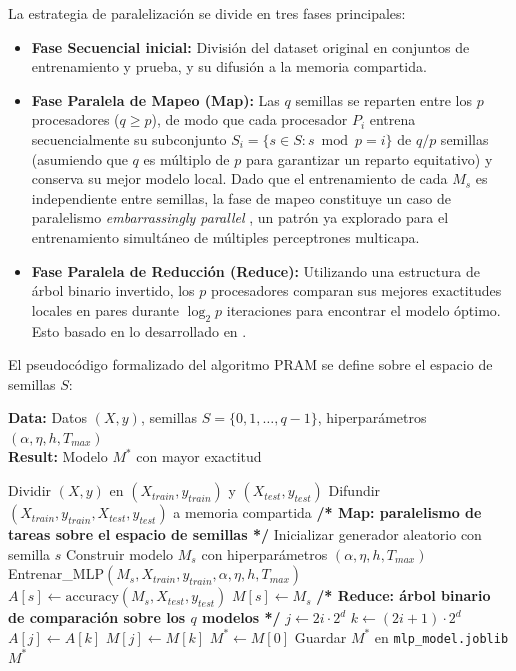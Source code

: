 \documentclass[11pt, a4paper]{article}
\begin{document}
La estrategia de paralelización se divide en tres fases principales:
\begin{itemize}
    \item \textbf{Fase Secuencial inicial:} División del dataset original en conjuntos de entrenamiento y prueba, y su difusión a la memoria compartida.
    \item \textbf{Fase Paralela de Mapeo (Map):} Las $q$ semillas se reparten entre los $p$ procesadores ($q \geq p$), de modo que cada procesador $P_i$ entrena secuencialmente su subconjunto $S_i = \{ s \in S : s \bmod p = i \}$ de $q/p$ semillas (asumiendo que $q$ es múltiplo de $p$ para garantizar un reparto equitativo) y conserva su mejor modelo local. Dado que el entrenamiento de cada $M_s$ es independiente entre semillas, la fase de mapeo constituye un caso de paralelismo \textit{embarrassingly parallel} \cite{farias2022parallelmlps}, un patrón ya explorado para el entrenamiento simultáneo de múltiples perceptrones multicapa.
    \item \textbf{Fase Paralela de Reducción (Reduce):} Utilizando una estructura de árbol binario invertido, los $p$ procesadores comparan sus mejores exactitudes locales en pares durante $ \log_2 p$ iteraciones para encontrar el modelo óptimo. Esto basado en lo desarrollado en \cite{u2.2}.
\end{itemize}

El pseudocódigo formalizado del algoritmo PRAM se define sobre el espacio de semillas $S$:

\begin{algorithm}[H]
\caption{Entrenamiento Paralelo de Múltiples MLP (CREW PRAM)}
\textbf{Data:} Datos $(X, y)$, semillas $S = \{0, 1, \dots, q-1\}$, hiperparámetros $(\alpha, \eta, h, T_{max})$\\
\textbf{Result:} Modelo $M^*$ con mayor exactitud
\begin{algorithmic}[1]
\State Dividir $(X, y)$ en $(X_{train}, y_{train})$ y $(X_{test}, y_{test})$
\State Difundir $(X_{train}, y_{train}, X_{test}, y_{test})$ a memoria compartida
\Statex
\State \textbf{/* Map: paralelismo de tareas sobre el espacio de semillas */}
    \State Inicializar generador aleatorio con semilla $s$
    \State Construir modelo $M_s$ con hiperparámetros $(\alpha, \eta, h, T_{max})$
    \State Entrenar\_MLP$(M_s, X_{train}, y_{train}, \alpha, \eta, h, T_{max})$
    \State $A[s] \gets \text{accuracy}(M_s, X_{test}, y_{test})$
    \State $M[s] \gets M_s$
\EndFor
\Statex
\State \textbf{/* Reduce: árbol binario de comparación sobre los $q$ modelos */}
        \State $j \gets 2i \cdot 2^d$
        \State $k \gets (2i+1) \cdot 2^d$
            \State $A[j] \gets A[k]$
            \State $M[j] \gets M[k]$
        \EndIf
    \EndFor
\EndFor
\Statex
\State $M^* \gets M[0]$
\State Guardar $M^*$ en \texttt{mlp\_model.joblib}
\State \Return $M^*$
\end{algorithmic}
\end{algorithm}
\end{document}
